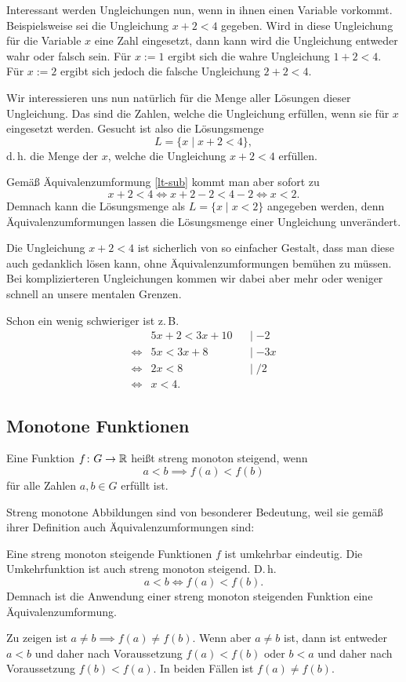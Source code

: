 Interessant werden Ungleichungen nun, wenn in ihnen einen Variable
vorkommt. Beispielsweise sei die Ungleichung $x+2<4$ gegeben.
Wird in diese Ungleichung für die Variable $x$ eine Zahl eingesetzt,
dann kann wird die Ungleichung entweder wahr oder falsch sein.
Für $x:=1$ ergibt sich die wahre Ungleichung $1+2<4$. Für $x:=2$
ergibt sich jedoch die falsche Ungleichung $2+2<4$.

Wir interessieren uns nun natürlich für die Menge aller Lösungen
dieser Ungleichung. Das sind die Zahlen, welche die Ungleichung
erfüllen, wenn sie für $x$ eingesetzt werden. Gesucht ist also
die Lösungsmenge
\[L = \{x\mid x+2<4\},\]
d.\,h. die Menge der $x$, welche die Ungleichung $x+2<4$ erfüllen.

Gemäß Äquivalenzumformung \eqref{lt-sub} kommt man aber sofort zu
\[x+2<4 \iff x+2-2<4-2 \iff x<2.\]
Demnach kann die Lösungsmenge als $L=\{x\mid x<2\}$ angegeben werden,
denn Äquivalenzumformungen lassen die Lösungsmenge einer Ungleichung
unverändert.

Die Ungleichung $x+2<4$ ist sicherlich von so einfacher Gestalt,
dass man diese auch gedanklich lösen kann, ohne Äquivalenzumformungen
bemühen zu müssen. Bei komplizierteren Ungleichungen kommen wir dabei
aber mehr oder weniger schnell an unsere mentalen Grenzen.

Schon ein wenig schwieriger ist z.\,B.
\begin{align*}
& 5x+2<3x+10 && |\;{-2}\\
\iff & 5x<3x+8 && |\;{-3x}\\
\iff & 2x<8 && |\;{/2}\\
\iff & x<4.
\end{align*}

\subsection{Monotone Funktionen}%

\begin{Definition}%
Eine Funktion $f\colon G\to\mathbb R$ heißt streng monoton steigend, wenn
\[a<b\implies f(a)<f(b)\]
für alle Zahlen $a,b\in G$ erfüllt ist.
\end{Definition}
Streng monotone Abbildungen sind von besonderer Bedeutung, weil
sie gemäß ihrer Definition auch Äquivalenzumformungen sind:

\begin{Satz}%
Eine streng monoton steigende Funktionen $f$ ist umkehrbar eindeutig.
Die Umkehrfunktion ist auch streng monoton steigend. D.\,h.
\[a<b\iff f(a)<f(b).\]
Demnach ist die Anwendung einer streng monoton steigenden
Funktion eine Äquivalenzumformung.
\end{Satz}
\noindent{}
Zu zeigen ist $a\ne b\implies f(a)\ne f(b)$. Wenn aber $a\ne b$
ist, dann ist entweder $a<b$ und daher nach Voraussetzung
$f(a)<f(b)$ oder $b<a$ und daher nach Voraussetzung $f(b)<f(a)$.
In beiden Fällen ist $f(a)\ne f(b)$.

